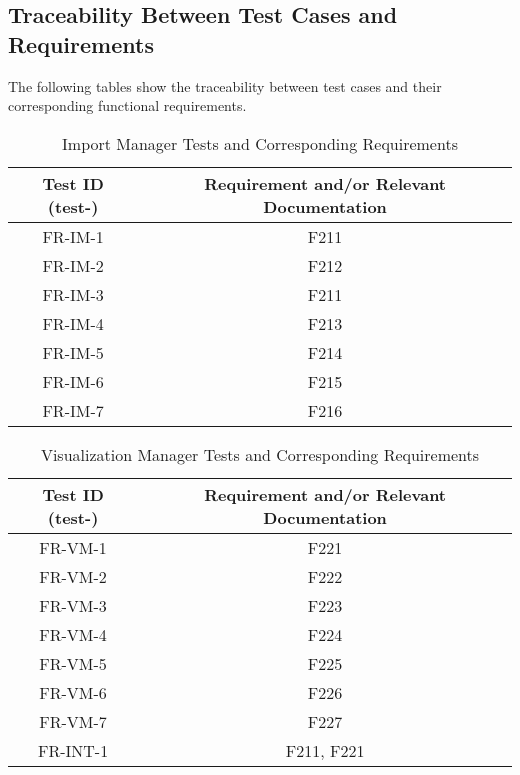 \documentclass[12pt, titlepage]{article}
\begin{document}
\newpage

\subsection{Traceability Between Test Cases and Requirements}

The following tables show the traceability between test cases and their corresponding functional requirements.

\iffalse
\wss{Provide a table that shows which test cases are supporting which
  requirements.}
\fi

\begin{table}[h!]
  \centering
  \caption{Import Manager Tests and Corresponding Requirements}
  \begin{tabular}{c c}
    \hline
    \textbf{Test ID (test-)} & \textbf{Requirement and/or Relevant Documentation} \\ \hline
    FR-IM-1 & F211\\
    FR-IM-2 & F212\\
    FR-IM-3 & F211\\
    FR-IM-4 & F213\\
    FR-IM-5 & F214\\
    FR-IM-6 & F215\\
    FR-IM-7 & F216\\
  \end{tabular}
\end{table}

\begin{table}[h!]
  \centering
  \caption{Visualization Manager Tests and Corresponding Requirements}
  \begin{tabular}{c c}
    \hline
    \textbf{Test ID (test-)} & \textbf{Requirement and/or Relevant Documentation} \\ \hline
    FR-VM-1 & F221\\
    FR-VM-2 & F222\\
    FR-VM-3 & F223\\
    FR-VM-4 & F224\\
    FR-VM-5 & F225\\
    FR-VM-6 & F226\\
    FR-VM-7 & F227\\
    FR-INT-1 & F211, F221\\
  \end{tabular}
\end{table}
\end{document}
